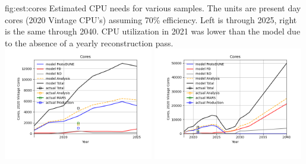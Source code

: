 \documentclass[../main-v1.tex]{subfiles}
\begin{document}
\begin{dunefigure}
{fig:est:cores}
{Estimated CPU needs for  various samples.  The units are present day cores  (2020 Vintage CPU's) assuming 70\% efficiency. Left is through 2025, right is the same through 2040. CPU utilization in 2021 was lower than the model due to the absence of a yearly reconstruction pass.}
\includegraphics[width=0.49\textwidth]{graphics/IntroFigures/2025/Parameters_2022-03-04-2025-Cores.png}
\includegraphics[width=0.49\textwidth]{graphics/IntroFigures/2040/Parameters_2022-03-04-2040-Cores.png}
\end{dunefigure}
\end{document}
